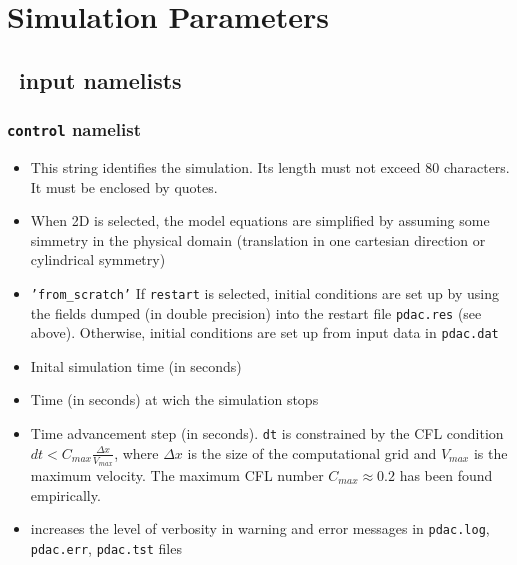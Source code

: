 \section{Simulation Parameters}
\label{section:input_par}

\subsection{\PDAC\ input namelists}
\label{section:namelists}

\subsubsection{{\tt control} namelist}

\begin{itemize}
\item
{}
{This string identifies the simulation. Its length must not exceed 80 characters. It must be enclosed by quotes.}

\item
{}
{When 2D is selected, the model equations are simplified by assuming
some simmetry in the physical domain (translation in one cartesian 
direction or cylindrical symmetry)}

\item
{}
{{\tt 'from\_scratch'}}
{If {\tt restart} is selected, initial conditions are set up by using the fields
dumped (in double precision) into the restart file {\tt pdac.res} (see above). 
Otherwise, initial conditions are set up from input data in {\tt pdac.dat}} 

\item
{}
{Inital simulation time (in seconds)}

\item
{}
{Time (in seconds) at wich the simulation stops}

\item
{}
{Time advancement step (in seconds). 
{\tt dt} is constrained by the CFL condition
$dt < C_{max}\frac{\Delta x}{V_{max}}$, where $\Delta x$ is
the size of the computational grid and $V_{max}$ is the maximum
velocity. The maximum CFL number $C_{max}\approx 0.2$ has been 
found empirically.}

\item
{}
{increases the level of verbosity in warning and error messages 
in {\tt pdac.log}, {\tt pdac.err}, {\tt pdac.tst} files}


\end{itemize}
